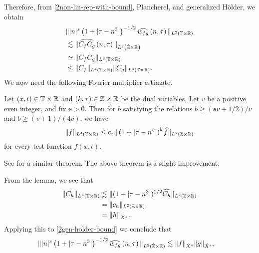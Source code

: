 %
%
Therefore, from \eqref{2non-lin-rep-with-bound}, Plancherel, and generalized 
H\"{o}lder, we obtain
%
%
\begin{equation}
	\label{2gen-holder-bound}
	\begin{split}
		& \| |n|^s \left( 1 + | \tau - n^3 | \right )^{-1/2}  \widehat{w_{fg}}\left( 
		n, \tau \right) \|_{L^2(\mathbb{T} \times \mathbb{R})}
		\\
		& \lesssim \|\widehat{C_f C_g }\left( n, \tau \right) 
		\|_{L^2\left( \dot{\mathbb{Z}} \times \mathbb{R} \right)}
		\\
		& \simeq \|C_f C_g \|_{L^2\left( \mathbb{T} \times \mathbb{R} \right)}
		\\
		& \le \|C_f \|_{L^4(\mathbb{T} \times \mathbb{R})} \|C_g \|_{L^4(\mathbb{T} \times \mathbb{R})}.
	\end{split}
\end{equation}
%
We now need the following Fourier multiplier estimate. 
\begin{lemma}
	\label{2lem:four-mult-est-L4}
	Let $(x, t) \in \mathbb{T} \times \mathbb{R} $ and $(k, \tau) \in \mathbb{Z} \times \mathbb{R}$ be
	the dual variables. Let $v$ be a positive even integer, and fix $\ee >
	0$. Then for $b$ satisfying the relations $b \ge (\ee v + 1/2)/v$ and $b \ge (v+1)/(4v)$, we have
\begin{equation}
	\label{2four-mult-est-L4}
	\begin{split}
		\|f\|_{L^4(\mathbb{T} \times \mathbb{R})} \le c_\varepsilon \|\left( 1 + | \tau - n^v | 
		\right)^b \widehat{f} \|_{L^2( \mathbb{Z} \times \mathbb{R})}
	\end{split}
\end{equation}
for every test function $f(x, t)$. 
%
%
%
%
\end{lemma}
\begin{framed}
%
%
\begin{remark}
  See \cite{Himonas:2007qf} for a similar theorem. The above theorem is a slight improvement. 
\end{remark}
%
%
\end{framed}
From the lemma, we see that
%
%
\begin{equation}
	\label{2four-mult-conseq}
	\begin{split}
		\|C_h\|_{L^4(\mathbb{T} \times \mathbb{R})} 
		& \lesssim \|(1 + | \tau - n^3 |)^{1/2} \widehat{C_h}
		\|_{L^2(\mathbb{Z} \times \mathbb{R})}
		\\
		& = \|c_{h} \|_{L^2(\mathbb{Z} \times \mathbb{R})} 
		\\
		& = \|h \|_{\dot{X}^s}. 
	\end{split}
\end{equation}
%
%
Applying this to \eqref{2gen-holder-bound} we
conclude that
\begin{equation*}
	\begin{split}
		\| |n|^s \left( 1 + | \tau - n^3 | \right ) ^{-1/2} \widehat{w_{fg}}\left( 
		n, \tau \right) \|_{L^2(\dot{\mathbb{Z}} \times \mathbb{R})}
		& \lesssim \|f\|_{\dot{X}^s} \|g\|_{\dot{X}^s}.
	\end{split}
\end{equation*}
%
%
%
